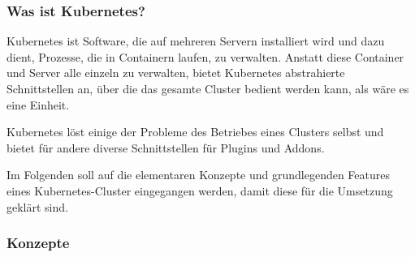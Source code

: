 \subsubsection{Was ist Kubernetes?}

Kubernetes ist Software, die auf mehreren Servern installiert wird und dazu dient,
Prozesse, die in Containern laufen, zu verwalten. Anstatt diese Container und
Server alle einzeln zu verwalten, bietet Kubernetes abstrahierte Schnittstellen an,
über die das gesamte Cluster bedient werden kann, als wäre es eine Einheit.

Kubernetes löst einige der Probleme des Betriebes eines Clusters selbst und
bietet für
andere diverse Schnittstellen für Plugins und Addons.

Im Folgenden soll auf die elementaren Konzepte und grundlegenden Features
eines Kubernetes-Cluster
eingegangen werden, damit diese für
die Umsetzung geklärt sind.

\subsubsection{Konzepte}

